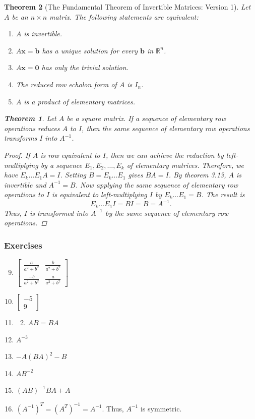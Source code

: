 \documentclass{article}
\newtheorem*{theorem*}{Theorem}
\newcommand{\vx}{\mathbf{x}}
\newcommand{\vb}{\mathbf{b}}
\newcommand{\colvecTwo}[2]{
  \begin{bmatrix}
    #1 \\
    #2
  \end{bmatrix}
}
\begin{document}
\begin{theorem*}[The Fundamental Theorem of Invertible Matrices: Version 1]
	Let $A$ be an $n\times n$ matrix. The following statements are equivalent:
	\begin{enumerate}
		\item $A$ is invertible.
		\item $A\vx=\vb$ has a unique solution for every $\vb$ in $\mathbb{R}^n$.
		\item $A\vx=\mathbf{0}$ has only the trivial solution.
		\item The reduced row echolon form of $A$ is $I_n$.
		\item $A$ is a product of elementary matrices.
	\end{enumerate}
	\begin{theorem*}
		Let $A$ be a square matrix. If a sequence of elementary row operations reduces $A$ to $I$, then
		the same sequence of elementary row operations transforms $I$ into $A^{-1}$.
	\end{theorem*}
	\begin{proof}
		If $A$ is row equivalent to $I$, then we can achieve the reduction by left-multiplying by a
		sequence $E_1, E_2, \ldots, E_k$ of elementary matrices. Therefore, we have $E_k\ldots E_1A=I$.
		Setting $B=E_k\ldots E_1$ gives $BA=I$. By theorem 3.13, $A$ is invertible and $A^{-1}=B$. Now
		applying the same sequence of elementary row operations to $I$ is equivalent to
		left-multiplying $I$ by $E_k\ldots E_1=B$. The result is
		\[E_k\ldots E_1I=BI=B=A^{-1}.\]
		Thus, $I$ is transformed into $A^{-1}$ by the same sequence of elementary row operations.
	\end{proof}
\end{theorem*}
\subsubsection*{Exercises}
\begin{enumerate}
	\setcounter{enumi}{8}
	\item $
		      \begin{bmatrix}
			      \frac{a}{a^2+b^2}  & \frac{b}{a^2+b^2} \\
			      \frac{-b}{a^2+b^2} & \frac{a}{a^2+b^2}
		      \end{bmatrix}$
	      \setcounter{enumi}{10}
	\item $\colvecTwo{-5}{9}$
	      \setcounter{enumi}{16}
	\item
	      \begin{enumerate}
		      \setcounter{enumii}{1}
		      \item $AB=BA$
	      \end{enumerate}
	      \setcounter{enumi}{19}
	\item $A^{-3}$
	\item $-A(BA)^2-B$
	\item $AB^{-2}$
	\item $(AB)^{-1}BA+A$
	      \setcounter{enumi}{45}
	\item $(A^{-1})^T=(A^T)^{-1}=A^{-1}$. Thus, $A^{-1}$ is symmetric.
\end{enumerate}
\end{document}
